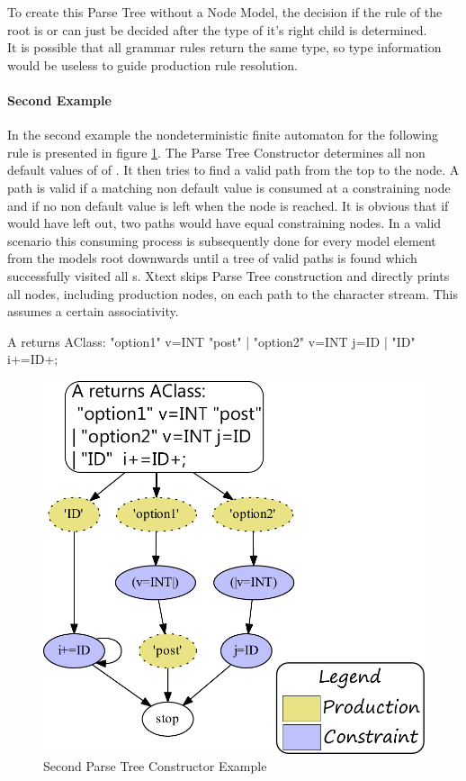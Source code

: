 To create this Parse Tree without a Node Model, the decision if the rule of the root  is  or  can just be decided after the type of it's right child  is determined. \\
It is possible that all grammar rules return the same type, so type information would be useless to guide production rule resolution.\\

\paragraph{Second Example}
In the second example the nondeterministic finite automaton for the following rule is presented in figure \ref{PTCEx}. The Parse Tree Constructor determines all non default values of  of . It then tries to find a valid path from the top to the  node. A path is valid if a matching non default value is consumed at a constraining node and if no non default value is left when the  node is reached. It is obvious that if  would have left out, two paths would have equal constraining nodes. In a valid scenario this consuming process is subsequently done for every model element from the models root downwards until a tree of valid paths is found which successfully visited all s. Xtext skips Parse Tree construction and directly prints all nodes, including production nodes, on each path to the character stream. This assumes a certain associativity.   

\begin{xtxt}
A returns AClass:  	"option1" v=INT "post"
				| 	"option2" v=INT j=ID
				|	"ID"	 i+=ID+;
\end{xtxt}

\begin{figure}
\centering
\includegraphics[scale=0.9]{gfx/pdf/A_AClass} 
\caption{Second Parse Tree Constructor Example}
\label{PTCEx}
\end{figure}


